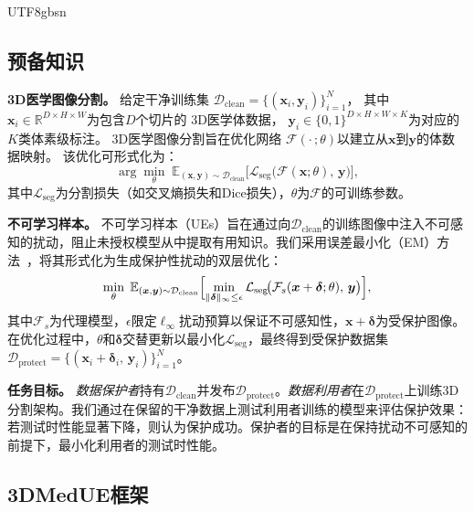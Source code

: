 \documentclass[a4paper,11pt]{article}
\begin{document}
\begin{CJK}{UTF8}{gbsn}
\subsection{预备知识}
\label{sec:preliminary}

\textbf{3D医学图像分割。}\quad
给定干净训练集
$\mathcal{D}_{\mathrm{clean}}\!=\!\{(\bm{x}_i,\bm{y}_i)\}_{i=1}^{N}$，
其中$\bm{x}_i\!\in\!\mathbb{R}^{D\times H\times W}$为包含$D$个切片的
3D医学体数据，
$\bm{y}_i\!\in\!\{0,1\}^{D\times H\times W\times K}$为对应的
$K$类体素级标注。
3D医学图像分割旨在优化网络
$\mathcal{F}(\cdot\,;\theta)$以建立从$\bm{x}$到$\bm{y}$的体数据映射。
该优化可形式化为：
\begin{equation}
  \arg\min_{\theta}\;
  \mathbb{E}_{(\bm{x},\bm{y})\sim\mathcal{D}_{\mathrm{clean}}}
  \bigl[\mathcal{L}_{\mathrm{seg}}\!\bigl(
    \mathcal{F}(\bm{x};\theta),\,\bm{y}\bigr)\bigr],
  \label{eq:seg}
\end{equation}
其中$\mathcal{L}_{\mathrm{seg}}$为分割损失（如交叉熵损失和Dice损失），$\theta$为$\mathcal{F}$的可训练参数。

\textbf{不可学习样本。}\quad
不可学习样本（UEs）旨在通过向$\mathcal{D}_{\mathrm{clean}}$的训练图像中注入不可感知的扰动，阻止未授权模型从中提取有用知识。我们采用误差最小化（EM）方法~\cite{huang2021unlearnable}，将其形式化为生成保护性扰动的双层优化：
\begin{equation}
  \min_{\theta}\;
  \mathbb{E}_{(\bm{x},\bm{y})\sim\mathcal{D}_{\mathrm{clean}}}
  \Bigl[\min_{\|\bm{\delta}\|_\infty\le\epsilon}
  \mathcal{L}_{\mathrm{seg}}\!\bigl(
    \mathcal{F}_s(\bm{x}+\bm{\delta};\theta),\,\bm{y}
  \bigr)\Bigr],
  \label{eq:ue}
\end{equation}
其中$\mathcal{F}_s$为代理模型，$\epsilon$限定$\ell_\infty$扰动预算以保证不可感知性，$\bm{x}+\bm{\delta}$为受保护图像。在优化过程中，$\theta$和$\bm{\delta}$交替更新以最小化$\mathcal{L}_{\mathrm{seg}}$，最终得到受保护数据集$\mathcal{D}_{\mathrm{protect}}\!=\!\{(\bm{x}_i+\bm{\delta}_i,\,\bm{y}_i)\}_{i=1}^{N}$。

\textbf{任务目标。}\quad
\textit{数据保护者}持有$\mathcal{D}_{\mathrm{clean}}$并发布$\mathcal{D}_{\mathrm{protect}}$。\textit{数据利用者}在$\mathcal{D}_{\mathrm{protect}}$上训练3D分割架构。我们通过在保留的干净数据上测试利用者训练的模型来评估保护效果：若测试时性能显著下降，则认为保护成功。保护者的目标是在保持扰动不可感知的前提下，最小化利用者的测试时性能。

\subsection{3DMedUE框架}
\label{sec:3DMedUE}


\end{CJK}
\end{document}
